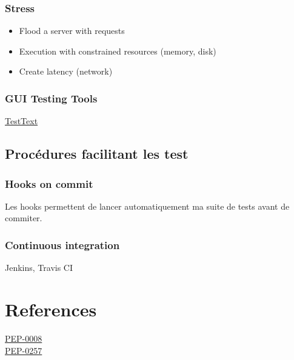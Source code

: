 \documentclass[a4paper]{report}
\begin{document}
\subsection{Stress}
\begin{itemize}
\item Flood a server with requests
\item Execution with constrained resources (memory, disk)   
\item Create latency (network)%
\end{itemize}

\subsection{GUI Testing Tools}
\href{http://texttest.sourceforge.net/index.php?page=ui_testing}{TestText}

\section{Procédures facilitant les test}
\subsection{Hooks on commit}
Les hooks permettent de lancer automatiquement ma suite de tests avant de commiter. 

\subsection{Continuous integration}
Jenkins, Travis CI


\chapter*{References}
\href{https://www.python.org/dev/peps/pep-0008/}{PEP-0008}\\
\href{https://www.python.org/dev/peps/pep-0257/}{PEP-0257}

	
\end{document}
